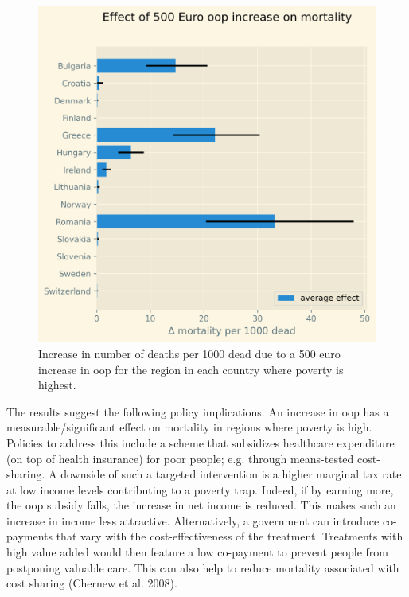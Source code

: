 \documentclass[a4paper,12pt]{article}
\makeatletter
\newcommand{\citeprocitem}[2]{\hyper@linkstart{cite}{citeproc_bib_item_#1}#2\hyper@linkend}
\makeatother
\begin{document}
\begin{figure}[htbp]
\centering
\includegraphics[width=.9\linewidth]{./figures/change_mortality_countries_baseline.png}
\caption{\label{fig:SummaryFigure}Increase in number of deaths per 1000 dead due to a 500 euro increase in oop for the region in each country where poverty is highest.}
\end{figure}


The results suggest the following policy implications. An increase in oop has a measurable/significant effect on mortality in regions where poverty is high. Policies to address this include a scheme that subsidizes healthcare expenditure (on top of health insurance) for poor people; e.g. through means-tested cost-sharing. A downside of such a targeted intervention is a higher marginal tax rate at low income levels contributing to a poverty trap. Indeed, if by earning more, the oop subsidy falls, the increase in net income is reduced. This makes such an increase in income less attractive. Alternatively, a government can introduce co-payments that vary with the cost-effectiveness of the treatment. Treatments with high value added would then feature a low co-payment to prevent people from postponing valuable care. This can also help to reduce mortality associated with cost sharing (\citeprocitem{7}{Chernew et al. 2008}).
\end{document}
